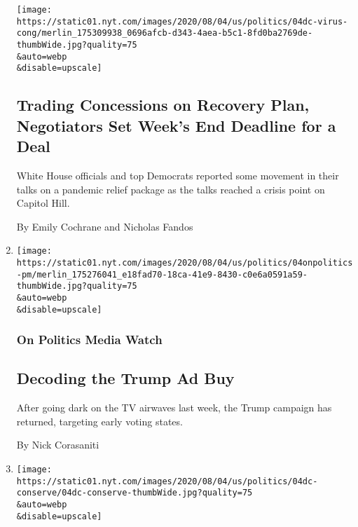 \begin{enumerate}
  \texttt{[image: https://static01.nyt.com/images/2020/08/04/us/politics/04dc-virus-cong/merlin\_175309938\_0696afcb-d343-4aea-b5c1-8fd0ba2769de-thumbWide.jpg?quality=75\\\&auto=webp\\\&disable=upscale]}

  \hypertarget{trading-concessions-on-recovery-plan-negotiators-set-weeks-end-deadline-for-a-deal}{%
  \subsection{Trading Concessions on Recovery Plan, Negotiators Set
  Week's End Deadline for a
  Deal}\label{trading-concessions-on-recovery-plan-negotiators-set-weeks-end-deadline-for-a-deal}}

  White House officials and top Democrats reported some movement in
  their talks on a pandemic relief package as the talks reached a crisis
  point on Capitol Hill.

  By Emily Cochrane and Nicholas Fandos
\item
  \href{/2020/08/04/us/politics/decoding-the-trump-ad-buy.html}{}

  \texttt{[image: https://static01.nyt.com/images/2020/08/04/us/politics/04onpolitics-pm/merlin\_175276041\_e18fad70-18ca-41e9-8430-c0e6a0591a59-thumbWide.jpg?quality=75\\\&auto=webp\\\&disable=upscale]}

  \hypertarget{on-politics-media-watch}{%
  \subsubsection{On Politics Media
  Watch}\label{on-politics-media-watch}}

  \hypertarget{decoding-the-trump-ad-buy}{%
  \subsection{Decoding the Trump Ad
  Buy}\label{decoding-the-trump-ad-buy}}

  After going dark on the TV airwaves last week, the Trump campaign has
  returned, targeting early voting states.

  By Nick Corasaniti
\item
  \href{/2020/08/04/us/politics/trump-land-conservation-bill.html}{}

  \texttt{[image: https://static01.nyt.com/images/2020/08/04/us/politics/04dc-conserve/04dc-conserve-thumbWide.jpg?quality=75\\\&auto=webp\\\&disable=upscale]}

  \hypertarget{trump-signs-landmark-land-conservation-bill}{%
}
\end{enumerate}
